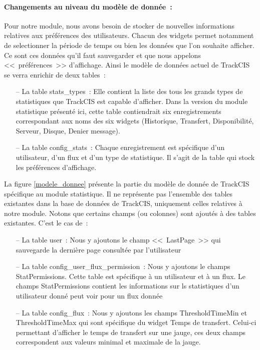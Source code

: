 			\paragraph{Changements au niveau du modèle de donnée~:}
			Pour notre module, nous avons besoin de stocker de nouvelles informations
			relatives aux préférences des utilisateurs. Chacun des widgets permet
			notamment de selectionner la période de temps ou bien les données que l'on
			souhaite afficher. Ce sont ces données qu'il faut sauvegarder et que nous
			appelons <<~préférences~>> d'affichage.
			Ainsi le modèle de données actuel de TrackCIS se verra enrichir de deux
			tables~:
			\begin{itemize}
			  \item[-- La table stats\_types~:] Elle contient la liste des tous les
			  grands types de statistiques que TrackCIS est capable d'afficher. Dans la
			  version du module statistique présenté ici, cette table contiendrait
			  six enregistrements correspondant aux noms des six widgets (Historique,
			  Transfert, Disponibilité, Serveur, Disque, Denier message).
			  \item[-- La table config\_stats~:] Chaque enregistrement est
			  spécifique d'un utilisateur, d'un flux et d'un type de statistique. Il
			  s'agit de la table qui stock les préférences d'affichage.
			\end{itemize}
			La figure \ref{modele_donnee} présente la partie du modèle de donnée de
			TrackCIS spécifique au module statistique. Il ne représente pas
			l'ensemble des tables existantes dans la base de données de TrackCIS,
			uniquement celles relatives à notre module. Notons que certains champs (ou
			colonnes) sont ajoutés à des tables existantes. C'est le cas de~:
			\begin{itemize}
			  \item[-- La table user~:] Nous y ajoutons le champ <<~LastPage~>> qui
			  sauvegarde la dernière page consultée par l'utilisateur
			  \item[-- La table config\_user\_flux\_permission~:] Nous y ajoutons le
			  champs StatPermissions. Cette table est spécifique à un utilisateur et à un flux.
			  Le champs StatPermissions contient les informations sur ls statistiques
			  d'un utilisateur donné peut voir pour un flux donnée
			  \item[-- La table config\_flux~:] Nous y ajoutons les champs
			  ThresholdTimeMin et ThresholdTimeMax qui sont spécifique du widget Temps de transfert.
			  Celui-ci permettant d'afficher le temps de transfert sur une jauge, ces
			  deux champs correspondent aux valeurs minimal et maximale de la jauge.
			\end{itemize}
